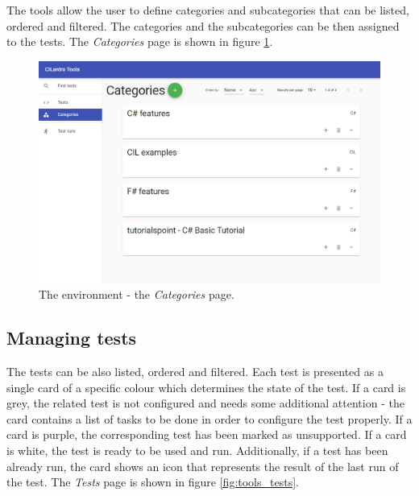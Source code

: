 \documentclass[declaration,shortabstract,english,mgr]{iithesis}
\begin{document}
The tools allow the user to define categories and subcategories that can be listed, ordered and filtered. The categories and the subcategories can be then assigned to the tests. The \textit{Categories} page is shown in figure \ref{fig:tools_categories}.

\begin{figure}
	\includegraphics[width=1\textwidth]{tools_categories.png}
    \centering
    \caption{The environment - the \textit{Categories} page.}
    \label{fig:tools_categories}
\end{figure}

\subsection{Managing tests}

The tests can be also listed, ordered and filtered. Each test is presented as a single card of a specific colour which determines the state of the test. If a card is grey, the related test is not configured and needs some additional attention - the card contains a list of tasks to be done in order to configure the test properly. If a card is purple, the corresponding test has been marked as unsupported. If a card is white, the test is ready to be used and run. Additionally, if a test has been already run, the card shows an icon that represents the result of the last run of the test. The \textit{Tests} page is shown in figure \ref{fig:tools_tests}.
\end{document}
